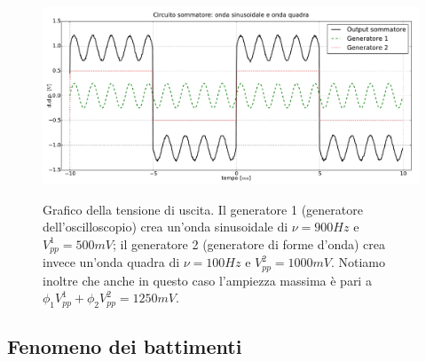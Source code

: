\begin{figure}[ht]
 \centering
   {\includegraphics[width=18cm]{../E01/latex/sinquad.pdf}}
 \caption{Grafico della tensione di uscita. Il generatore 1 (generatore dell'oscilloscopio) crea un'onda sinusoidale di $\nu=900 Hz$ e $V^1_{pp}=500 mV$; il generatore 2 (generatore di forme d'onda) crea invece un'onda quadra di $\nu=100 Hz$ e $V^2_{pp}=1000 mV$. Notiamo inoltre che anche in questo caso l'ampiezza massima è pari a $\phi_1 V^1_{pp}+\phi_2 V^2_{pp}=1250 mV$.}
 \label{gr:onde2}
\end{figure}

\subsection{Fenomeno dei battimenti}


















